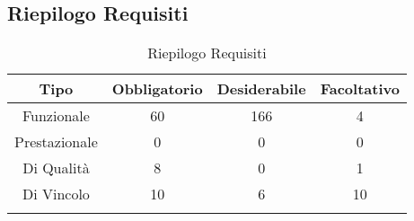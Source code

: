 \subsection{Riepilogo Requisiti}
\normalsize
\begin{longtable}{|c|c|c|c|}
\hline 
\textbf{Tipo} & \textbf{Obbligatorio} & \textbf{Desiderabile} & \textbf{Facoltativo}\\
\hline
Funzionale & 60 & 166 & 4\\ \hline
Prestazionale & 0 & 0 & 0\\ \hline
Di Qualità & 8 & 0 & 1\\ \hline
Di Vincolo & 10 & 6 & 10\\ \hline
\caption[Riepilogo Requisiti]{Riepilogo Requisiti}
\label{tabella:riepilogorequi}
\end{longtable}
\clearpage
